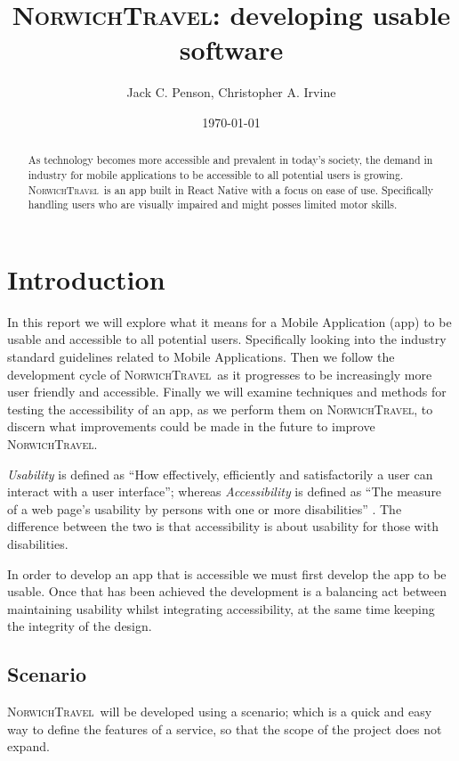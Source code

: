\documentclass[cmpstyle]{ueacmpstyle}
\newcommand{\nt}{\textsc{NorwichTravel}}
\begin{document}
	\title{\textsc{NorwichTravel}: developing usable software}
	\author{Jack C. Penson, Christopher A. Irvine}
	\date{\today}
	\maketitle
	\begin{abstract}
		As technology becomes more accessible and prevalent in today's society, the demand in industry for mobile applications to be accessible to all potential users is growing. \nt \ is an app built in React Native with a focus on ease of use. Specifically handling users who are visually impaired and might posses limited motor skills. %
	\end{abstract}
	\section{Introduction} \label{sec:intro}
	In this report we will explore what it means for a Mobile Application (app) to be usable and accessible to all potential users. Specifically looking into the industry standard guidelines related to Mobile Applications. Then we follow the development cycle of \nt \ as it progresses to be increasingly more user friendly and accessible. Finally we will examine techniques and methods for testing the accessibility of an app, as we perform them on \nt, to discern what improvements could be made in the future to improve \nt.
	
	\textit{Usability} is defined as ``How effectively, efficiently and satisfactorily a user can interact with a user interface''; whereas \textit{Accessibility} is defined as ``The measure of a web page's usability by persons with one or more disabilities'' \citep{usability}. The difference between the two is that accessibility is about usability for those with disabilities.
	
	In order to develop an app that is accessible we must first develop the app to be usable. Once that has been achieved the development is a balancing act between maintaining usability whilst integrating accessibility, at the same time keeping the integrity of the design.
	
		\subsection{Scenario} \label{sec:scenario}
		\nt \ will be developed using a scenario; which is a quick and easy way to define the features of a service, so that the scope of the project does not expand.
		
\end{document}
